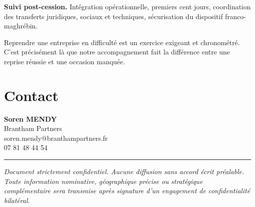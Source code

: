 \documentclass[11pt,a4paper]{article}
\begin{document}
\textbf{Suivi post-cession.} Intégration opérationnelle, premiers cent jours, coordination des transferts juridiques, sociaux et techniques, sécurisation du dispositif franco-maghrébin.

Reprendre une entreprise en difficulté est un exercice exigeant et chronométré. C'est précisément là que notre accompagnement fait la différence entre une reprise réussie et une occasion manquée.

\section{Contact}

\textbf{Soren MENDY}\\
Brantham Partners\\
soren.mendy@branthampartners.fr\\
07 81 48 44 54

\vspace{1em}
\hrule
\vspace{1em}

\begin{center}
\footnotesize \itshape
Document strictement confidentiel. Aucune diffusion sans accord écrit préalable. Toute information nominative, géographique précise ou stratégique complémentaire sera transmise après signature d'un engagement de confidentialité bilatéral.
\end{center}
\end{document}
